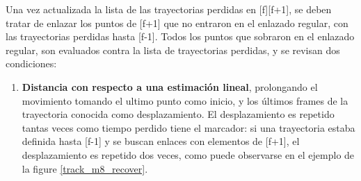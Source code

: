 \begin{itemize}
Una vez actualizada la lista de las trayectorias perdidas en [f][f+1], se deben tratar de enlazar los puntos de [f+1] que no entraron en el enlazado regular, con las trayectorias perdidas hasta [f-1]. Todos los puntos que sobraron en el enlazado regular, son evaluados contra la lista de trayectorias perdidas, y se revisan dos condiciones:

\begin{enumerate}
  \item \textbf{Distancia con respecto a una estimación lineal}, prolongando el movimiento tomando el ultimo punto como inicio, y los últimos frames de la trayectoria conocida como desplazamiento. El desplazamiento es repetido tantas veces como tiempo perdido tiene el marcador: si una trayectoria estaba definida hasta [f-1] y se buscan enlaces con elementos de [f+1], el desplazamiento es repetido dos veces, como puede observarse en el ejemplo de la figure \ref{track_m8_recover}. 
 
\begin{figure}[H]
 \centering
  \hspace{3 mm}
	

\end{figure}
\end{enumerate}
\end{itemize}
